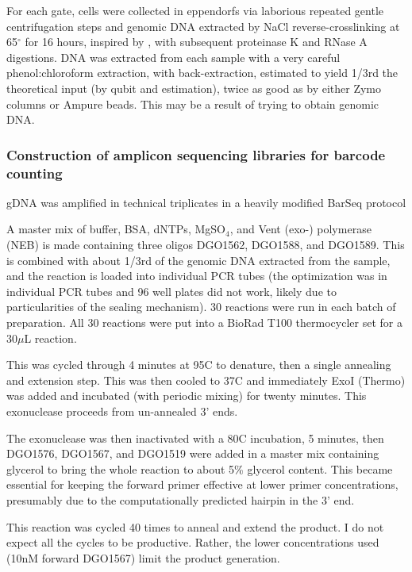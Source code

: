 For each gate, cells were collected in eppendorfs via laborious 
repeated gentle centrifugation steps and genomic
DNA extracted by NaCl reverse-crosslinking at 65$^{\circ}$ for 16
hours, inspired by \cite{klemm2014transcriptional}, with
subsequent proteinase K and RNase A digestions.
DNA was extracted from each sample with a very careful
phenol:chloroform extraction, with back-extraction, estimated to yield
1/3rd the theoretical input (by qubit and estimation), twice as good
as by either Zymo columns or Ampure beads. This may be a result of
trying to obtain genomic DNA.

\subsubsection{Construction of amplicon sequencing libraries for barcode counting}

gDNA was amplified in technical triplicates in a heavily modified 
BarSeq protocol

A master mix of buffer, BSA, dNTPs, MgSO$_4$, and Vent (exo-)
polymerase (NEB) is made containing three oligos DGO1562, DGO1588, 
and DGO1589.
This is combined with about 1/3rd of the genomic DNA extracted
from the sample, and the reaction is loaded into individual PCR
tubes (the optimization was in individual PCR tubes and 96 well 
plates did not work, likely due to particularities of the sealing
mechanism).
30 reactions were run in each batch of preparation. All 30 reactions
were put into a BioRad T100 thermocycler set for a 30\(\mu\)L
reaction.

This was cycled through 4 minutes at 95C to denature, then a single
annealing and extension step. This was then cooled to 37C and
immediately ExoI (Thermo) was added and incubated (with periodic
mixing) for twenty minutes. This exonuclease proceeds from
un-annealed 3' ends. 


The exonuclease was then inactivated with a 80C incubation, 5 minutes,
then DGO1576, DGO1567, and DGO1519 were added in a master mix
containing glycerol to bring the whole reaction to about 5\% glycerol
content. This became essential for keeping the forward primer
effective at lower primer concentrations, presumably due to the
computationally predicted hairpin in the 3' end.

This reaction was cycled 40 times to anneal and extend the product.
I do not expect all the cycles to be productive. 
Rather, the lower concentrations used
(10nM forward DGO1567) limit the product generation.

